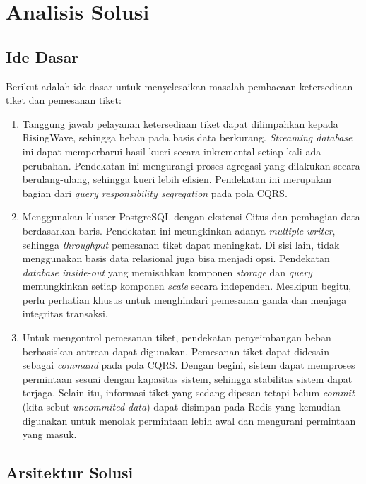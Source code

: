 \section{Analisis Solusi}

\subsection{Ide Dasar}

Berikut adalah ide dasar untuk menyelesaikan masalah pembacaan ketersediaan tiket dan pemesanan tiket:

\begin{enumerate}
  \item Tanggung jawab pelayanan ketersediaan tiket dapat dilimpahkan kepada RisingWave, sehingga beban pada basis data berkurang. \textit{Streaming database} ini dapat memperbarui hasil kueri secara inkremental setiap kali ada perubahan. Pendekatan ini mengurangi proses agregasi yang dilakukan secara berulang-ulang, sehingga kueri lebih efisien. Pendekatan ini merupakan bagian dari \textit{query responsibility segregation} pada pola CQRS.
  \item Menggunakan kluster PostgreSQL dengan ekstensi Citus dan pembagian data berdasarkan baris. Pendekatan ini meungkinkan adanya \textit{multiple writer}, sehingga \textit{throughput} pemesanan tiket dapat meningkat. Di sisi lain, tidak menggunakan basis data relasional juga bisa menjadi opsi. Pendekatan \textit{database inside-out} yang memisahkan komponen \textit{storage} dan \textit{query} memungkinkan setiap komponen \textit{scale} secara independen. Meskipun begitu, perlu perhatian khusus untuk menghindari pemesanan ganda dan menjaga integritas transaksi.
  \item Untuk mengontrol pemesanan tiket, pendekatan penyeimbangan beban berbasiskan antrean dapat digunakan. Pemesanan tiket dapat didesain sebagai \textit{command} pada pola CQRS. Dengan begini, sistem dapat memproses permintaan sesuai dengan kapasitas sistem, sehingga stabilitas sistem dapat terjaga. Selain itu, informasi tiket yang sedang dipesan tetapi belum \textit{commit} (kita sebut \textit{uncommited data}) dapat disimpan pada Redis yang kemudian digunakan untuk menolak permintaan lebih awal dan mengurani permintaan yang masuk.
\end{enumerate}

\subsection{Arsitektur Solusi}

